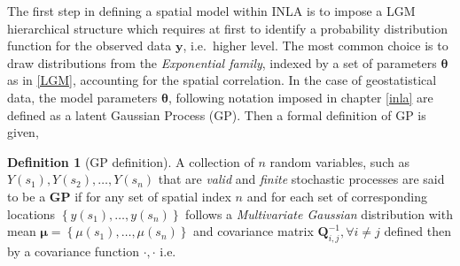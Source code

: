 \documentclass[
  12pt,
  a4paper,
  oneside]{book}
\theoremstyle{definition}
\newtheorem{definition}{Definition}[chapter]
\theoremstyle{definition}
\theoremstyle{definition}
\theoremstyle{remark}
\begin{document}
The first step in defining a spatial model within INLA is to impose a LGM hierarchical structure which requires at first to identify a probability distribution function for the observed data \(\boldsymbol{\mathbf{y}}\), i.e.~higher level. The most common choice is to draw distributions from the \emph{Exponential family}, indexed by a set of parameters \(\boldsymbol\theta\) as in \ref{LGM}, accounting for the spatial correlation.
In the case of geostatistical data, the model parameters \(\boldsymbol\theta\), following notation imposed in chapter \ref{inla} are defined as a latent Gaussian Process (GP). Then a formal definition of GP is given,

\begin{definition}[GP definition]
\protect\hypertarget{def:GP}{}{\label{def:GP} {} }A collection of \(n\) random variables, such as \(Y(s_{1}), Y(s_{2}) , \ldots, Y(s_{n})\) that are \emph{valid} and \emph{finite} stochastic processes are said to be a \textbf{GP} if for any set of spatial index \(n\) and for each set of corresponding locations \(\left\{y\left(s_{1}\right), \ldots, y\left(s_{n}\right)\right\}\) follows a \emph{Multivariate Gaussian} distribution with mean \(\boldsymbol{\mu}=\left\{\mu\left(s_{1}\right), \ldots, \mu\left(s_{n}\right)\right\}\) and covariance matrix \(\mathbf{Q}^{-1}_{i,j}, \forall i \neq j\) defined then by a covariance function \(\mathscr{\cdot, \cdot}\) i.e.~
\end{definition}
\end{document}
